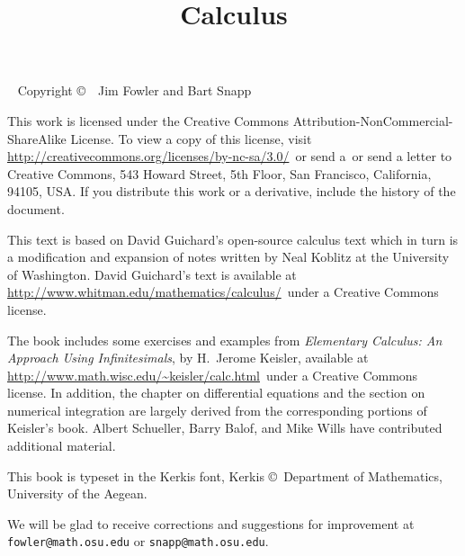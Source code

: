 \documentclass[justified,openany,nofonts]{tufte-book}
\title{Calculus}
\begin{document}
\maketitle



\begin{fullwidth}
~\vfill
\thispagestyle{empty}
\setlength{\parindent}{0pt}
\setlength{\parskip}{\baselineskip}
Copyright \copyright\ \the\year\ Jim Fowler and Bart Snapp

This work is licensed under the Creative Commons
Attribution-NonCommercial-ShareAlike License. To view a copy of this
license, visit
\url{http://creativecommons.org/licenses/by-nc-sa/3.0/}~or send a~or send a
letter to Creative Commons, 543 Howard Street, 5th Floor, San
Francisco, California, 94105, USA. If you distribute this work or a
derivative, include the history of the document.

\noindent
This text is based on David Guichard's open-source calculus text which
in turn is a modification and expansion of notes written by Neal
Koblitz at the University of Washington. David Guichard's text is
available at \url{http://www.whitman.edu/mathematics/calculus/}~under a Creative Commons license.

\noindent The book includes some exercises and examples from {\it
  Elementary Calculus: An Approach Using Infinitesimals}, by H.~Jerome
Keisler, available at
\url{http://www.math.wisc.edu/~keisler/calc.html}~under a Creative
Commons license. In addition, the chapter on differential equations
and the section on numerical integration are largely derived from the
corresponding portions of Keisler's book.  Albert Schueller, Barry
Balof, and Mike Wills have contributed additional material.

\noindent This book is typeset in the Kerkis font, 
Kerkis \copyright~Department of Mathematics, University of the Aegean.


\noindent We will be glad to receive corrections and suggestions for
improvement at \texttt{fowler@math.osu.edu} or
\texttt{snapp@math.osu.edu}.

\end{fullwidth}

\tableofcontents


\end{document}
